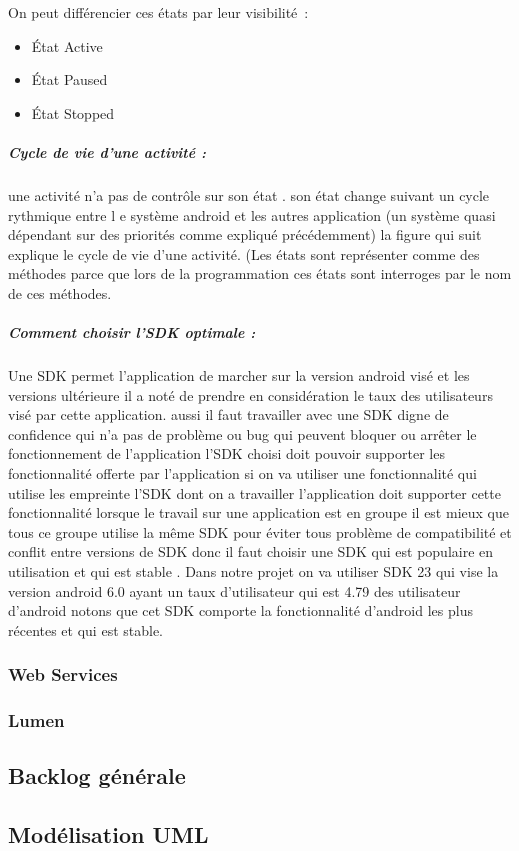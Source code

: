 On peut différencier ces états par leur visibilité :
\begin{itemize}
 \item État Active
 \item État Paused 
 \item État Stopped
\end{itemize}

\subparagraph{Cycle de vie d'une activité :}

une activité n'a pas de contrôle sur son état . 
son état change suivant un cycle rythmique entre l
e système android et les autres application (un système quasi 
dépendant sur des priorités comme expliqué précédemment) la figure qui suit 
explique le cycle de vie d'une activité. (Les états sont représenter comme des 
méthodes parce que lors de la programmation ces états sont interroges par le nom 
de ces méthodes.


\subparagraph{Comment choisir l'SDK optimale :}
Une SDK permet l'application de marcher sur la version android visé
et les versions ultérieure il  a noté de prendre en considération le taux des 
utilisateurs visé par cette application. aussi il faut travailler avec une SDK 
digne de confidence qui n'a pas de problème ou bug qui peuvent  bloquer ou arrêter
le fonctionnement de l'application l'SDK choisi doit pouvoir supporter les 
fonctionnalité offerte par l'application si on va utiliser une fonctionnalité
qui utilise les empreinte l'SDK dont on a travailler l'application doit supporter
cette fonctionnalité lorsque le travail sur une application est en groupe il est 
mieux que tous ce groupe utilise la même SDK pour éviter tous problème de 
compatibilité et conflit entre versions de SDK  donc il faut choisir une SDK 
qui est populaire en utilisation et qui est stable . Dans notre projet on va 
utiliser SDK 23 qui vise la version android 6.0 ayant un taux d'utilisateur 
qui est 4.79 %
des utilisateur d'android notons que cet SDK comporte
la fonctionnalité d'android les plus récentes et qui est stable.
\subsubsection{Web Services}

\subsubsection{Lumen}

\subsection{Backlog générale}

\subsection{Modélisation UML}
